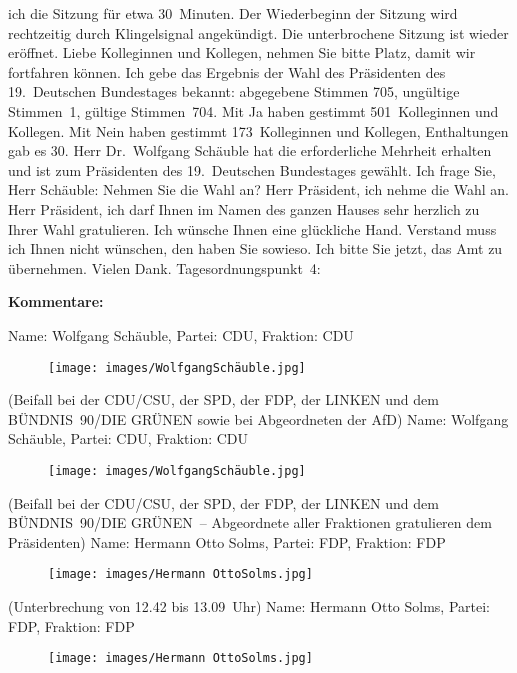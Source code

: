 \documentclass[10pt, a4paper]{report}
\begin{document}
ich die Sitzung für etwa 30 Minuten. Der Wiederbeginn der Sitzung wird rechtzeitig durch Klingelsignal angekündigt. Die unterbrochene Sitzung ist wieder eröffnet. Liebe Kolleginnen und Kollegen, nehmen Sie bitte Platz, damit wir fortfahren können. Ich gebe das Ergebnis der Wahl des Präsidenten des 19. Deutschen Bundestages bekannt: abgegebene Stimmen 705, ungültige Stimmen 1, gültige Stimmen 704. Mit Ja haben gestimmt 501 Kolleginnen und Kollegen. Mit Nein haben gestimmt 173 Kolleginnen und Kollegen, Enthaltungen gab es 30. Herr Dr. Wolfgang Schäuble hat die erforderliche Mehrheit erhalten und ist zum Präsidenten des 19. Deutschen Bundestages gewählt. Ich frage Sie, Herr Schäuble: Nehmen Sie die Wahl an? Herr Präsident, ich nehme die Wahl an. Herr Präsident, ich darf Ihnen im Namen des ganzen Hauses sehr herzlich zu Ihrer Wahl gratulieren. Ich wünsche Ihnen eine glückliche Hand. Verstand muss ich Ihnen nicht wünschen, den haben Sie sowieso. Ich bitte Sie jetzt, das Amt zu übernehmen. Vielen Dank. Tagesordnungspunkt 4: 

\textbf{Kommentare:}

Name: Wolfgang Schäuble, Partei: CDU, Fraktion: CDU

\begin{figure}[!ht]
\texttt{[image: images/WolfgangSchäuble.jpg]}
\end{figure}


(Beifall bei der CDU/CSU, der SPD, der FDP, der LINKEN und dem BÜNDNIS 90/DIE GRÜNEN sowie bei Abgeordneten der AfD)
Name: Wolfgang Schäuble, Partei: CDU, Fraktion: CDU

\begin{figure}[!ht]
\texttt{[image: images/WolfgangSchäuble.jpg]}
\end{figure}


(Beifall bei der CDU/CSU, der SPD, der FDP, der LINKEN und dem BÜNDNIS 90/DIE GRÜNEN – Abgeordnete aller Fraktionen gratulieren dem Präsidenten)
Name: Hermann Otto Solms, Partei: FDP, Fraktion: FDP

\begin{figure}[!ht]
\texttt{[image: images/Hermann OttoSolms.jpg]}
\end{figure}


(Unterbrechung von 12.42 bis 13.09 Uhr)
Name: Hermann Otto Solms, Partei: FDP, Fraktion: FDP

\begin{figure}[!ht]
\texttt{[image: images/Hermann OttoSolms.jpg]}
\end{figure}
\end{document}

